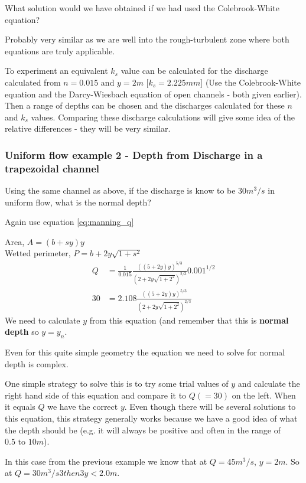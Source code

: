 \documentclass[a4paper, 12pt, british]{article} %
\numberwithin{equation}{section}
\numberwithin{figure}{section}
\numberwithin{table}{section}
\begin{document}
What solution would we have obtained if we had used the Colebrook-White equation?

Probably very similar as we are well into the rough-turbulent zone where both equations are truly applicable.

To experiment an equivalent $k_s$ value can be calculated for the discharge calculated from $n = 0.015$  and $y = 2m$ [$k_s = 2.225mm$] (Use the Colebrook-White equation and the Darcy-Wiesbach equation of open channels - both given earlier). Then a range of depths can be chosen and the discharges calculated for these $n$ and $k_s$ values. Comparing these discharge calculations will give some idea of the relative differences - they will be very similar.


\subsubsection{Uniform flow example 2 - Depth from Discharge in a trapezoidal channel}

Using the same channel as above, if the discharge is know to be $30m^3/s$ in uniform flow, what is the normal depth?

Again use equation \ref{eq:manning_q} 

Area, $A =(b+sy)y$  \\
Wetted perimeter, $P =b+2y\sqrt{1+s^2}$
\begin{align*}
Q &= \frac{1}{0.015}\frac{((5+2y)y)^{5/3}}{\left(2+2y\sqrt{1+2^2}\right)^{2/3}}0.001^{1/2}\\
30 &= 2.108\frac{((5+2y)y)^{5/3}}{\left(2+2y\sqrt{1+2^2}\right)^{2/3}}
\end{align*}
We need to calculate $y$ from this equation (and remember that this is \textbf{normal depth} so $y = y_n$. 

Even for this quite simple geometry the equation we need to solve for normal depth is complex. 

One simple strategy to solve this is to try some trial values of $y$ and calculate the right hand side of this equation and compare it to $Q (=30)$ on the left. When it equals $Q$ we have the correct $y$. Even though there will be several solutions to this equation, this strategy generally works because we have a good idea of what the depth should be (e.g. it will always be positive and often in the range of $0.5 \text{ to } 10 m$). 

In this case from the previous example we know that at $Q = 45 m^3/s$, $y = 2m$. So at $Q = 30 m^3/s3 then 3y < 2.0m$.
\end{document}
